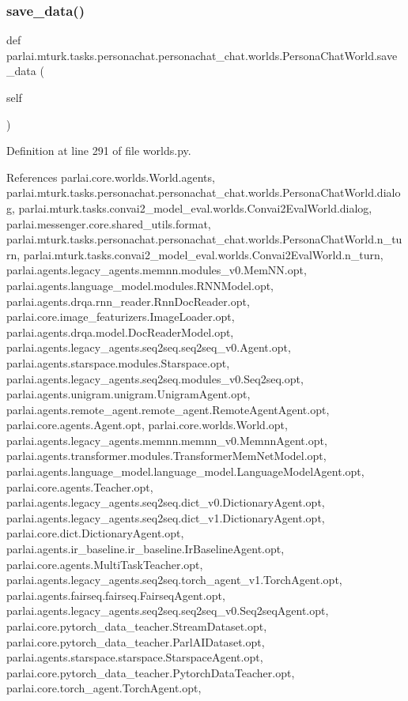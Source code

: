 \subsubsection{\texorpdfstring{save\+\_\+data()}{save\_data()}}
{\footnotesize\ttfamily def parlai.\+mturk.\+tasks.\+personachat.\+personachat\+\_\+chat.\+worlds.\+Persona\+Chat\+World.\+save\+\_\+data (\begin{DoxyParamCaption}\item[{}]{self }\end{DoxyParamCaption})}



Definition at line 291 of file worlds.\+py.



References parlai.\+core.\+worlds.\+World.\+agents, parlai.\+mturk.\+tasks.\+personachat.\+personachat\+\_\+chat.\+worlds.\+Persona\+Chat\+World.\+dialog, parlai.\+mturk.\+tasks.\+convai2\+\_\+model\+\_\+eval.\+worlds.\+Convai2\+Eval\+World.\+dialog, parlai.\+messenger.\+core.\+shared\+\_\+utils.\+format, parlai.\+mturk.\+tasks.\+personachat.\+personachat\+\_\+chat.\+worlds.\+Persona\+Chat\+World.\+n\+\_\+turn, parlai.\+mturk.\+tasks.\+convai2\+\_\+model\+\_\+eval.\+worlds.\+Convai2\+Eval\+World.\+n\+\_\+turn, parlai.\+agents.\+legacy\+\_\+agents.\+memnn.\+modules\+\_\+v0.\+Mem\+N\+N.\+opt, parlai.\+agents.\+language\+\_\+model.\+modules.\+R\+N\+N\+Model.\+opt, parlai.\+agents.\+drqa.\+rnn\+\_\+reader.\+Rnn\+Doc\+Reader.\+opt, parlai.\+core.\+image\+\_\+featurizers.\+Image\+Loader.\+opt, parlai.\+agents.\+drqa.\+model.\+Doc\+Reader\+Model.\+opt, parlai.\+agents.\+legacy\+\_\+agents.\+seq2seq.\+seq2seq\+\_\+v0.\+Agent.\+opt, parlai.\+agents.\+starspace.\+modules.\+Starspace.\+opt, parlai.\+agents.\+legacy\+\_\+agents.\+seq2seq.\+modules\+\_\+v0.\+Seq2seq.\+opt, parlai.\+agents.\+unigram.\+unigram.\+Unigram\+Agent.\+opt, parlai.\+agents.\+remote\+\_\+agent.\+remote\+\_\+agent.\+Remote\+Agent\+Agent.\+opt, parlai.\+core.\+agents.\+Agent.\+opt, parlai.\+core.\+worlds.\+World.\+opt, parlai.\+agents.\+legacy\+\_\+agents.\+memnn.\+memnn\+\_\+v0.\+Memnn\+Agent.\+opt, parlai.\+agents.\+transformer.\+modules.\+Transformer\+Mem\+Net\+Model.\+opt, parlai.\+agents.\+language\+\_\+model.\+language\+\_\+model.\+Language\+Model\+Agent.\+opt, parlai.\+core.\+agents.\+Teacher.\+opt, parlai.\+agents.\+legacy\+\_\+agents.\+seq2seq.\+dict\+\_\+v0.\+Dictionary\+Agent.\+opt, parlai.\+agents.\+legacy\+\_\+agents.\+seq2seq.\+dict\+\_\+v1.\+Dictionary\+Agent.\+opt, parlai.\+core.\+dict.\+Dictionary\+Agent.\+opt, parlai.\+agents.\+ir\+\_\+baseline.\+ir\+\_\+baseline.\+Ir\+Baseline\+Agent.\+opt, parlai.\+core.\+agents.\+Multi\+Task\+Teacher.\+opt, parlai.\+agents.\+legacy\+\_\+agents.\+seq2seq.\+torch\+\_\+agent\+\_\+v1.\+Torch\+Agent.\+opt, parlai.\+agents.\+fairseq.\+fairseq.\+Fairseq\+Agent.\+opt, parlai.\+agents.\+legacy\+\_\+agents.\+seq2seq.\+seq2seq\+\_\+v0.\+Seq2seq\+Agent.\+opt, parlai.\+core.\+pytorch\+\_\+data\+\_\+teacher.\+Stream\+Dataset.\+opt, parlai.\+core.\+pytorch\+\_\+data\+\_\+teacher.\+Parl\+A\+I\+Dataset.\+opt, parlai.\+agents.\+starspace.\+starspace.\+Starspace\+Agent.\+opt, parlai.\+core.\+pytorch\+\_\+data\+\_\+teacher.\+Pytorch\+Data\+Teacher.\+opt, parlai.\+core.\+torch\+\_\+agent.\+Torch\+Agent.\+opt, 